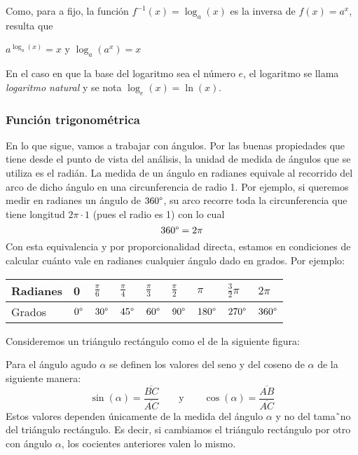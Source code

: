 \documentclass[../teoria.root.tex]{subfiles}
\begin{document}
Como, para a fijo, la función \(f^{−1}(x) = \log_a(x)\) es la inversa de \(f(x) = a^x\), resulta que
\begin{center}
	\(a^{\log_a(x)}=x\) y \(\log_a(a^x)=x\)
\end{center}
En el caso en que la base del logaritmo sea el número \(e\), el logaritmo se llama \textit{logaritmo natural} y se nota \(\log_e(x) = \ln(x)\).
\subsubsection{Función trigonométrica}
En lo que sigue, vamos a trabajar con ángulos.
Por las buenas propiedades que tiene desde el punto de vista del análisis, la unidad de medida de ángulos que se utiliza es el radián.
La medida de un ángulo en radianes equivale al recorrido del arco de dicho ángulo en una circunferencia de radio 1.
Por ejemplo, si queremos medir en radianes un ángulo de \(360\degree\), su arco recorre toda la circunferencia que tiene longitud \(2\pi \cdot 1\) (pues el radio es 1) con lo cual \[360\degree=2\pi\]
Con esta equivalencia y por proporcionalidad directa, estamos en condiciones de calcular cuánto vale en radianes cualquier ángulo dado en grados.
Por ejemplo:

\begin{center}
	\begin{tabularx}{\textwidth}{|m{2cm}|X|X|X|X|X|X|X|X|}
		\hline
		Radianes & 0            & \(\frac{\pi}{6}\) & \(\frac{\pi}{4}\) & \(\frac{\pi}{3}\) & \(\frac{\pi}{2}\) & \(\pi\)        & \(\frac{3}{2}\pi\) & \(2\pi\)       \\\hline
		Grados   & \(0\degree\) & \(30\degree\)     & \(45\degree\)     & \(60\degree\)     & \(90\degree\)     & \(180\degree\) & \(270\degree\)     & \(360\degree\) \\\hline
	\end{tabularx}
\end{center}
Consideremos un triángulo rectángulo como el de la siguiente figura:
\begin{center}
\end{center}
Para el ángulo agudo \(\alpha\) se definen los valores del seno y del coseno de \(\alpha\) de la siguiente manera:
\[\sin(\alpha)=\frac{\overline{BC}}{\overline{AC}}\qquad\text{y}\qquad\cos(\alpha)=\frac{\overline{AB}}{\overline{AC}}\]
Estos valores dependen únicamente de la medida del ángulo \(\alpha\) y no del tama˜no del triángulo rectángulo.
Es decir, si cambiamos el triángulo rectángulo por otro con ángulo \(\alpha\), los cocientes anteriores valen lo mismo.
\end{document}
